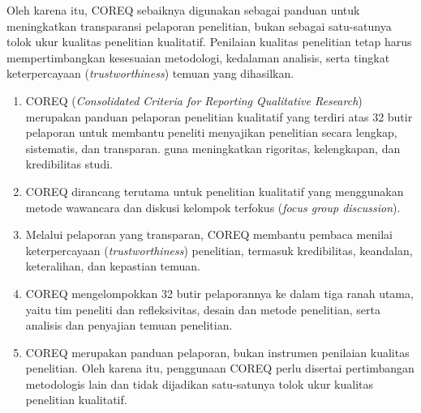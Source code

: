 \documentclass[
  indonesian,
  letterpaper,
  DIV=11,
  numbers=noendperiod]{scrreprt}
\providecommand{\tightlist}{%
  \setlength{\itemsep}{0pt}\setlength{\parskip}{0pt}}
\begin{document}
Oleh karena itu, COREQ sebaiknya digunakan sebagai panduan untuk
meningkatkan transparansi pelaporan penelitian, bukan sebagai
satu-satunya tolok ukur kualitas penelitian kualitatif. Penilaian
kualitas penelitian tetap harus mempertimbangkan kesesuaian metodologi,
kedalaman analisis, serta tingkat keterpercayaan
(\emph{trustworthiness}) temuan yang dihasilkan.

\begin{tcolorbox}[enhanced jigsaw, colframe=quarto-callout-tip-color-frame, toptitle=1mm, breakable, leftrule=.75mm, arc=.35mm, toprule=.15mm, colback=white, colbacktitle=quarto-callout-tip-color!10!white, bottomtitle=1mm, bottomrule=.15mm, titlerule=0mm, title=\textcolor{quarto-callout-tip-color}{\faLightbulb}\hspace{0.5em}{Rangkuman}, coltitle=black, left=2mm, opacitybacktitle=0.6, opacityback=0, rightrule=.15mm]

\begin{enumerate}
\def\labelenumi{\arabic{enumi}.}
\tightlist
\item
  COREQ (\emph{Consolidated Criteria for Reporting Qualitative
  Research}) merupakan panduan pelaporan penelitian kualitatif yang
  terdiri atas 32 butir pelaporan untuk membantu peneliti menyajikan
  penelitian secara lengkap, sistematis, dan transparan. guna
  meningkatkan rigoritas, kelengkapan, dan kredibilitas studi.
\item
  COREQ dirancang terutama untuk penelitian kualitatif yang menggunakan
  metode wawancara dan diskusi kelompok terfokus (\emph{focus group
  discussion}).
\item
  Melalui pelaporan yang transparan, COREQ membantu pembaca menilai
  keterpercayaan (\emph{trustworthiness}) penelitian, termasuk
  kredibilitas, keandalan, keteralihan, dan kepastian temuan.
\item
  COREQ mengelompokkan 32 butir pelaporannya ke dalam tiga ranah utama,
  yaitu tim peneliti dan refleksivitas, desain dan metode penelitian,
  serta analisis dan penyajian temuan penelitian.
\item
  COREQ merupakan panduan pelaporan, bukan instrumen penilaian kualitas
  penelitian. Oleh karena itu, penggunaan COREQ perlu disertai
  pertimbangan metodologis lain dan tidak dijadikan satu-satunya tolok
  ukur kualitas penelitian kualitatif.
\end{enumerate}

\end{tcolorbox}
\end{document}

